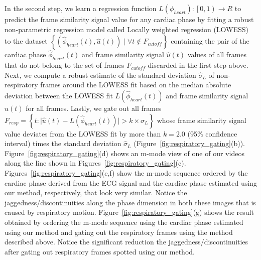 \documentclass[journal]{IEEEtran}
\begin{document}
	In the second step, we learn a regression function $L(\phi_{heart}) : \left [  0, 1\right ) \to R$ to predict the frame similarity signal value for any cardiac phase by fitting a robust non-parametric regression model called Locally weighted regression (LOWESS)~\cite{Cleveland1988} to the dataset $\left \{ \left(\hat{\phi}_{heart}(t), \hat{u}(t) \right) \mid \forall t \notin F_{cutoff}  \right \}$ containing the pair of the cardiac phase $\hat{\phi}_{heart}(t)$ and frame similarity signal $\hat{u}(t)$  values of all frames that do not belong to the set of frames $F_{cutoff}$ discarded in the first step above. Next, we compute a robust estimate of the standard deviation $\hat{\sigma}_{L}$ of non-respiratory frames around the LOWESS fit based on the median absolute deviation between the LOWESS fit $L( \hat{\phi}_{heart}(t) )$ and frame similarity signal $\hat{u}(t)$ for all frames. Lastly, we gate out all frames $F_{resp} = \left \{ t : \lvert \hat{u}(t) - L( \hat{\phi}_{heart}(t) ) \rvert   > k \times \hat{\sigma}_{L}  \right \}$
whose frame similarity signal value deviates from the LOWESS fit by more than $k = 2.0$ (95\% confidence interval) times the standard deviation $\hat{\sigma}_{L}$ (Figure~\ref{fig:respiratory_gating}(b)). 
Figure~\ref{fig:respiratory_gating}(d) shows an m-mode view of one of our videos along the line shown in Figures~\ref{fig:respiratory_gating}(c). Figures~\ref{fig:respiratory_gating}(e,f) show the m-mode sequence ordered by the cardiac phase derived from the ECG signal and the cardiac phase estimated using our method, respectively, that look very similar. Notice the jaggedness/discontinuities along the phase dimension in both these images that is caused by respiratory motion. Figure~\ref{fig:respiratory_gating}(g) shows the result obtained by ordering the m-mode sequence using the cardiac phase estimated using our method and gating out the respiratory frames using the method described above. Notice the significant reduction the jaggedness/discontinuities after gating out respiratory frames spotted using our method.
%
\end{document}
